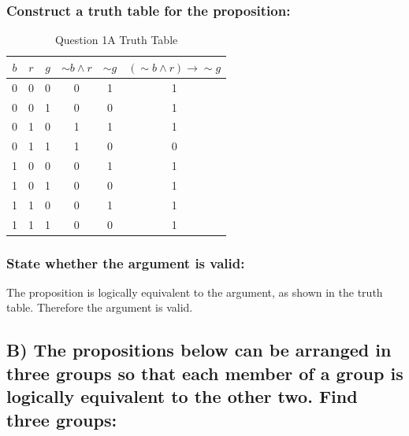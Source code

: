 \documentclass[12pt,a4paper]{article}
\begin{document}
\subsubsection{Construct a truth table for the proposition:}
\begin{table}[h]
\centering
\caption{Question 1A Truth Table}
\begin{tabular}{c|c|c|c|c|c}
$b$ & $r$ & $g$ & $\sim{b} \wedge r$ & $\sim{g}$ & $(\sim{b} \wedge r) \rightarrow \sim{g}$ \\
\hline
0 & 0 & 0 & 0 & 1 & 1 \\
\hline
0 & 0 & 1 & 0 & 0 & 1 \\
\hline
0 & 1 & 0 & 1 & 1 & 1 \\
\hline
0 & 1 & 1 & 1 & 0 & 0 \\
\hline
1 & 0 & 0 & 0 & 1 & 1 \\
\hline
1 & 0 & 1 & 0 & 0 & 1 \\
\hline
1 & 1 & 0 & 0 & 1 & 1 \\
\hline
1 & 1 & 1 & 0 & 0 & 1 \\
\hline
\end{tabular}
\end{table}

\subsubsection{State whether the argument is valid:}

The proposition is logically equivalent to the argument, as shown in the truth table. Therefore the argument is valid.


\newpage
\subsection{B) The propositions below can be arranged in three groups so that each member of a group is logically equivalent to the other two. Find three groups:}
\end{document}
